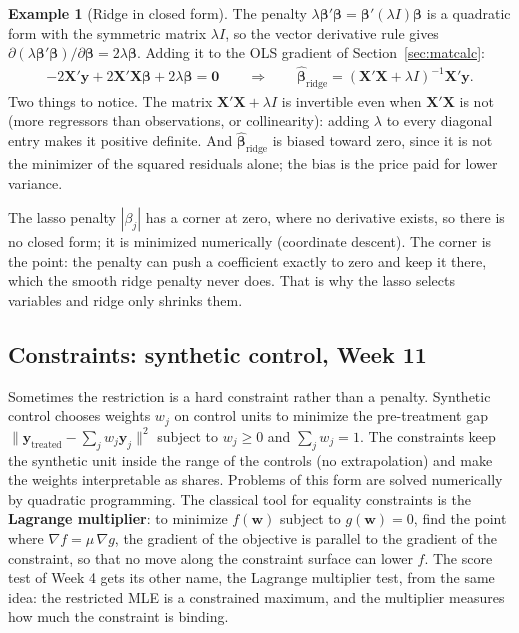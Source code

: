 \documentclass[11pt]{article}
\theoremstyle{definition}
\newtheorem{example}{Example}[section]
\newcommand{\X}{\bm{X}}
\newcommand{\Y}{\bm{y}}
\newcommand{\bbeta}{\bm{\beta}}
\newcommand{\bhat}{\hat{\bm{\beta}}}
\begin{document}
\begin{example}[Ridge in closed form]
The penalty $\lambda\bbeta'\bbeta = \bbeta'(\lambda I)\bbeta$ is a
quadratic form with the symmetric matrix $\lambda I$, so the vector
derivative rule gives $\partial(\lambda\bbeta'\bbeta)/\partial\bbeta =
2\lambda\bbeta$. Adding it to the OLS gradient of
Section~\ref{sec:matcalc}:
\begin{align*}
  -2\X'\Y + 2\X'\X\bbeta + 2\lambda\bbeta = \bm 0
  \qquad\Longrightarrow\qquad
  \bhat_{\text{ridge}} = (\X'\X + \lambda I)^{-1}\X'\Y .
\end{align*}
Two things to notice. The matrix $\X'\X + \lambda I$ is invertible even
when $\X'\X$ is not (more regressors than observations, or collinearity):
adding $\lambda$ to every diagonal entry makes it positive definite. And
$\bhat_{\text{ridge}}$ is biased toward zero, since it is not the
minimizer of the squared residuals alone; the bias is the price paid for
lower variance.
\end{example}

The lasso penalty $|\beta_j|$ has a corner at zero, where no derivative
exists, so there is no closed form; it is minimized numerically
(coordinate descent). The corner is the point: the penalty can push a
coefficient exactly to zero and keep it there, which the smooth ridge
penalty never does. That is why the lasso selects variables and ridge only
shrinks them.

\subsection{Constraints: synthetic control, Week 11}

Sometimes the restriction is a hard constraint rather than a penalty.
Synthetic control chooses weights $w_j$ on control units to minimize the
pre-treatment gap $\|\bm y_{\text{treated}} - \sum_j w_j\bm y_j\|^2$
subject to $w_j \ge 0$ and $\sum_j w_j = 1$. The constraints keep the
synthetic unit inside the range of the controls (no extrapolation) and
make the weights interpretable as shares. Problems of this form are solved
numerically by quadratic programming. The classical tool for equality
constraints is the \textbf{Lagrange multiplier}: to minimize $f(\bm w)$
subject to $g(\bm w) = 0$, find the point where $\nabla f = \mu\,\nabla g$,
the gradient of the objective is parallel to the gradient of the
constraint, so that no move along the constraint surface can lower $f$.
The score test of Week 4 gets its other name, the Lagrange multiplier
test, from the same idea: the restricted MLE is a constrained maximum, and
the multiplier measures how much the constraint is binding.
\end{document}
